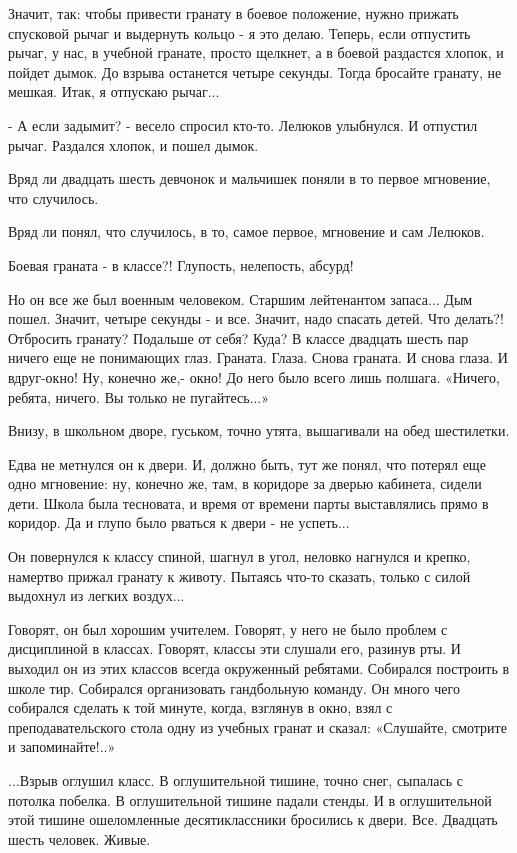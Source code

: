 Значит, так: чтобы привести гранату в боевое положение, нужно прижать спусковой
рычаг и выдернуть кольцо - я это делаю. Теперь, если отпустить рычаг, у нас, в
учебной гранате, просто щелкнет, а в боевой раздастся хлопок, и пойдет дымок.
До взрыва останется четыре секунды. Тогда бросайте гранату, не мешкая. Итак, я
отпускаю рычаг...

- А если задымит? - весело спросил кто-то.
Лелюков улыбнулся. И отпустил рычаг. Раздался хлопок, и пошел дымок.

Вряд ли двадцать шесть девчонок и мальчишек поняли в то первое мгновение, что случилось.

Вряд ли понял, что случилось, в то, самое первое, мгновение и сам Лелюков.

Боевая граната - в классе?! Глупость, нелепость, абсурд!

Но он все же был военным человеком. Старшим лейтенантом запаса... Дым пошел.
Значит, четыре секунды - и все. Значит, надо спасать детей. Что делать?!
Отбросить гранату? Подальше от себя? Куда? В классе двадцать шесть пар ничего
еще не понимающих глаз. Граната. Глаза. Снова граната. И снова глаза. И
вдруг-окно! Ну, конечно же,- окно! До него было всего лишь полшага. «Ничего,
ребята, ничего. Вы только не пугайтесь...»

Внизу, в школьном дворе, гуськом, точно утята, вышагивали на обед шестилетки.

Едва не метнулся он к двери. И, должно быть, тут же понял, что потерял еще одно
мгновение: ну, конечно же, там, в коридоре за дверью кабинета, сидели дети.
Школа была тесновата, и время от времени парты выставлялись прямо в коридор. Да
и глупо было рваться к двери - не успеть...

Он повернулся к классу спиной, шагнул в угол, неловко нагнулся и крепко,
намертво прижал гранату к животу. Пытаясь что-то сказать, только с силой
выдохнул из легких воздух...

Говорят, он был хорошим учителем. Говорят, у него не было проблем с дисциплиной
в классах. Говорят, классы эти слушали его, разинув рты. И выходил он из этих
классов всегда окруженный ребятами. Собирался построить в школе тир. Собирался
организовать гандбольную команду. Он много чего собирался сделать к той минуте,
когда, взглянув в окно, взял с преподавательского стола одну из учебных гранат
и сказал: «Слушайте, смотрите и запоминайте!..»

...Взрыв оглушил класс. В оглушительной тишине, точно снег, сыпалась с потолка
побелка. В оглушительной тишине падали стенды. И в оглушительной этой тишине
ошеломленные десятиклассники бросились к двери.  Все. Двадцать шесть человек.
Живые.

